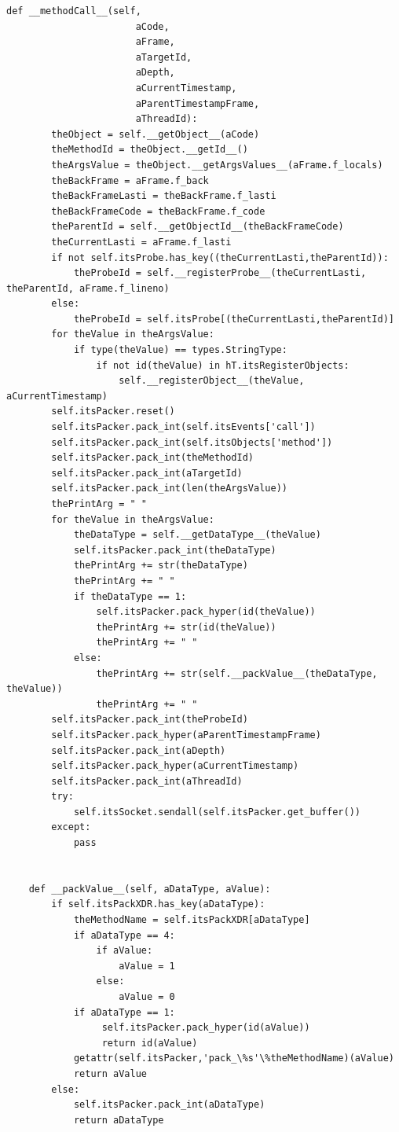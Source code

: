 \documentclass[12pt,legalpaper]{report}
\begin{document}
\begin{singlespace}
\begin{lstlisting}[style=Python]
    def __methodCall__(self,
                       aCode,
                       aFrame, 
                       aTargetId,
                       aDepth,
                       aCurrentTimestamp,
                       aParentTimestampFrame,
                       aThreadId):
        theObject = self.__getObject__(aCode)
        theMethodId = theObject.__getId__()
        theArgsValue = theObject.__getArgsValues__(aFrame.f_locals)
        theBackFrame = aFrame.f_back
        theBackFrameLasti = theBackFrame.f_lasti
        theBackFrameCode = theBackFrame.f_code
        theParentId = self.__getObjectId__(theBackFrameCode)
        theCurrentLasti = aFrame.f_lasti        
        if not self.itsProbe.has_key((theCurrentLasti,theParentId)):
            theProbeId = self.__registerProbe__(theCurrentLasti, theParentId, aFrame.f_lineno)
        else:
            theProbeId = self.itsProbe[(theCurrentLasti,theParentId)]
        for theValue in theArgsValue:
            if type(theValue) == types.StringType:
                if not id(theValue) in hT.itsRegisterObjects:
                    self.__registerObject__(theValue, aCurrentTimestamp)            
        self.itsPacker.reset()
        self.itsPacker.pack_int(self.itsEvents['call'])
        self.itsPacker.pack_int(self.itsObjects['method'])
        self.itsPacker.pack_int(theMethodId)
        self.itsPacker.pack_int(aTargetId)
        self.itsPacker.pack_int(len(theArgsValue))
        thePrintArg = " "
        for theValue in theArgsValue:
            theDataType = self.__getDataType__(theValue)
            self.itsPacker.pack_int(theDataType)
            thePrintArg += str(theDataType)
            thePrintArg += " "
            if theDataType == 1:
                self.itsPacker.pack_hyper(id(theValue))
                thePrintArg += str(id(theValue))
                thePrintArg += " "
            else:
                thePrintArg += str(self.__packValue__(theDataType, theValue))
                thePrintArg += " "
        self.itsPacker.pack_int(theProbeId)
        self.itsPacker.pack_hyper(aParentTimestampFrame)
        self.itsPacker.pack_int(aDepth)    
        self.itsPacker.pack_hyper(aCurrentTimestamp)
        self.itsPacker.pack_int(aThreadId)
        try:
            self.itsSocket.sendall(self.itsPacker.get_buffer())
        except:
            pass
    
    
    def __packValue__(self, aDataType, aValue):
        if self.itsPackXDR.has_key(aDataType):
            theMethodName = self.itsPackXDR[aDataType]
            if aDataType == 4:
                if aValue:
                    aValue = 1
                else:
                    aValue = 0
            if aDataType == 1:
                 self.itsPacker.pack_hyper(id(aValue))
                 return id(aValue)
            getattr(self.itsPacker,'pack_\%s'\%theMethodName)(aValue)
            return aValue            
        else:
            self.itsPacker.pack_int(aDataType)
            return aDataType


\end{lstlisting}
\end{singlespace}
\end{document}
